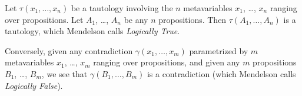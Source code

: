 \begin{node}\label{prop-000A}%
Let $\tau(x_{1},\dots,x_{n})$ be a tautology involving the $n$
metavariables $x_{1}$, \dots, $x_{n}$ ranging over propositions. Let
$A_{1}$, \dots, $A_{n}$ be any $n$ propositions. Then $\tau(A_{1},\dots,
A_{n})$ is a tautology, which Mendelson calls \textit{Logically True}.

Conversely, given any contradiction $\gamma(x_{1},\dots, x_{m})$
parametrized by $m$ metavariables $x_{1}$, \dots, $x_{m}$ ranging over
propositions, and given any $m$ propositions $B_{1}$, \dots, $B_{m}$, we
see that $\gamma(B_{1},\dots,B_{m})$ is a contradiction (which Mendelson
calls \textit{Logically False}).
\end{node}
